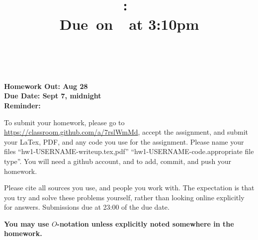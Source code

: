 \documentclass{article}
\title{    \vspace{2in}
    \textmd{\textbf{\hmwkClass:\ \hmwkTitle}}\\
    \normalsize\vspace{0.1in}\small{Due\ on\ \hmwkDueDate\ at 3:10pm}\\
    \vspace{0.1in}\large{\textit{\hmwkClassInstructor\ \hmwkClassTime}}
    \vspace{3in}
}
\author{\hmwkAuthorName}
\date{}
\theoremstyle{plain}
\newcommand{\hmwkAssignedDate}{Aug 28}
\newcommand{\hmwkDueDate}{Sept 7, midnight}
\begin{document}

\pagebreak

{\bf Homework Out: \hmwkAssignedDate}\\
{\bf Due Date:  \hmwkDueDate}\\
{\bf Reminder: }

To submit your homework, please go to
\url{https://classroom.github.com/a/7rslWmMd}, accept the assignment,
and submit your LaTex, PDF, and any code you use for the
assignment. Please name your files ``hw1-USERNAME-writeup.{tex,pdf}''
``hw1-USERNAME-code.{appropriate file type}''. You will need a github
account, and to add, commit, and push your homework.

Please cite all sources you use, and people you work with. The
expectation is that you try and solve these problems yourself, rather
than looking online explicitly for answers. Submissions due at 23:00
of the due date.

{\bf You may use $O$-notation unless explicitly noted somewhere in the homework.}


\newcommand{\X}{\mathcal{X}}
\newcommand{\Y}{\mathcal{Y}}
\newcommand{\D}{\mathcal{D}}
\end{document}
